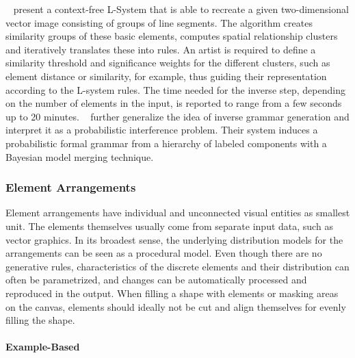 \citeauthor*{stava_2010_ipm}~\cite{stava_2010_ipm} present a context-free L-System that is able to recreate a given two-dimensional vector image consisting of groups of line segments. The algorithm creates similarity groups of these basic elements, computes spatial relationship clusters and iteratively translates these into rules. An artist is required to define a similarity threshold and significance weights for the different clusters, such as element distance or similarity, for example, thus guiding their representation according to the L-system rules. The time needed for the inverse step, depending on the number of elements in the input, is reported to range from a few seconds up to 20 minutes. \citeauthor*{talton_2012_ldp}~\cite{talton_2012_ldp} further generalize the idea of inverse grammar generation and interpret it as a probabilistic interference problem. Their system induces a probabilistic formal grammar from a hierarchy of labeled components with a Bayesian model merging technique.


\subsubsection{Element Arrangements}
\label{subsubsec:analysis_element_arrangements}

Element arrangements have individual and unconnected visual entities as smallest unit. The elements themselves usually come from separate input data, such as vector graphics. In its broadest sense, the underlying distribution models for the arrangements can be seen as a procedural model. Even though there are no generative rules, characteristics of the discrete elements and their distribution can often be parametrized, and changes can be automatically processed and reproduced in the output. When filling a shape with elements or masking areas on the canvas, elements should ideally not be cut and align themselves for evenly filling the shape.

\paragraph*{Example-Based}
\label{para:analysis_element_arrangements_example}

